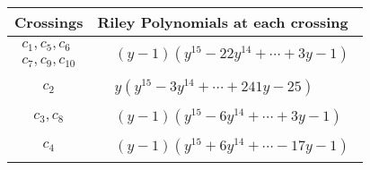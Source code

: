 \documentclass[1p]{elsarticle_modified}
\theoremstyle{definition}
\begin{document}
\begin{tabular}{m{50pt}|m{274pt}}
Crossings & \hspace{64pt}Riley Polynomials at each crossing \\
\hline $$\begin{aligned}c_{1},c_{5},c_{6}\\c_{7},c_{9},c_{10}\end{aligned}$$&$\begin{aligned}
&(y-1)(y^{15}-22 y^{14}+\cdots+3 y-1)
\end{aligned}$\\
\hline $$\begin{aligned}c_{2}\end{aligned}$$&$\begin{aligned}
&y(y^{15}-3 y^{14}+\cdots+241 y-25)
\end{aligned}$\\
\hline $$\begin{aligned}c_{3},c_{8}\end{aligned}$$&$\begin{aligned}
&(y-1)(y^{15}-6 y^{14}+\cdots+3 y-1)
\end{aligned}$\\
\hline $$\begin{aligned}c_{4}\end{aligned}$$&$\begin{aligned}
&(y-1)(y^{15}+6 y^{14}+\cdots-17 y-1)
\end{aligned}$\\
\hline
\end{tabular}
\vskip 2pc
\end{document}
